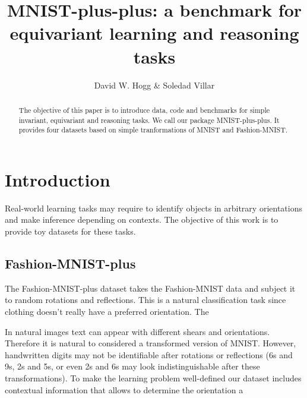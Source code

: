 \documentclass{article}
\title{\bfseries MNIST-plus-plus: a benchmark for equivariant learning and reasoning tasks}
\author{David W. Hogg \& Soledad Villar}
\date{}
\begin{document}
\maketitle

\begin{abstract}\noindent
    The objective of this paper is to introduce data, code and benchmarks for simple invariant, equivariant and reasoning tasks. We call our package MNIST-plus-plus. It provides four datasets based on simple tranformations of MNIST and Fashion-MNIST.
\end{abstract}

\section{Introduction}

Real-world learning tasks may require to identify objects in arbitrary orientations and make inference depending on contexts. The objective of this work is to provide toy datasets for these tasks. 

\subsection{Fashion-MNIST-plus}
The Fashion-MNIST-plus dataset takes the Fashion-MNIST data and subject it to random rotations and reflections. This is a natural classification task since clothing doesn't really have a preferred orientation.
The 

In natural images text can appear with different shears and orientations. Therefore it is natural to considered a transformed version of MNIST. However, handwritten digits may not be identifiable after rotations or reflections (6s and 9s, 2s and 5s, or even 2s and 6s may look indistinguishable after these transformations). To make the learning problem well-defined our dataset includes contextual information that allows to determine the orientation a
\end{document}
